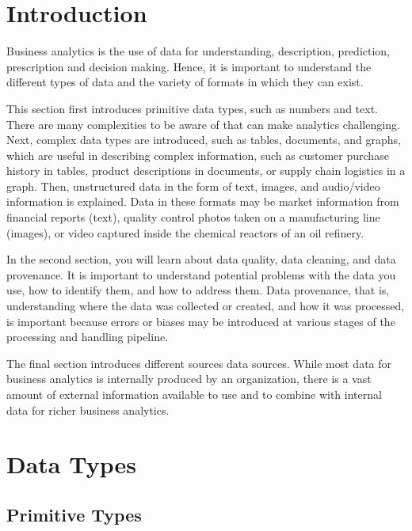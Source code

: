 %
%

\section{Introduction}

Business analytics is the use of data for understanding, description, prediction, prescription and decision making. Hence, it is important to understand the different types of data and the variety of formats in which they can exist. 

This section first introduces primitive data types, such as numbers and text. There are many complexities to be aware of that can make analytics challenging. Next, complex data types are introduced, such as tables, documents, and graphs, which are useful in describing complex information, such as customer purchase history in tables, product descriptions in documents, or supply chain logistics in a graph. Then, unstructured data in the form of text, images, and audio/video information is explained. Data in these formats may be market information from financial reports (text), quality control photos taken on a manufacturing line (images), or video captured inside the chemical reactors of an oil refinery.

In the second section, you will learn about data quality, data cleaning, and data provenance. It is important to understand potential problems with the data you use, how to identify them, and how to address them. Data provenance, that is, understanding where the data was collected or created, and how it was processed, is important because errors or biases may be introduced at various stages of the processing and handling pipeline.

The final section introduces different sources data sources. While most data for business analytics is internally produced by an organization, there is a vast amount of external information available to use and to combine with internal data for richer business analytics. 

\section{Data Types}

\subsection{Primitive Types}

